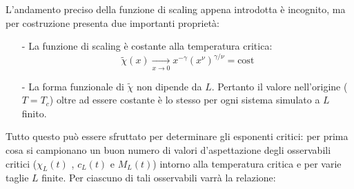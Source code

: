 \medskip
L'andamento preciso della funzione di scaling appena introdotta è incognito, ma per costruzione presenta due importanti proprietà:
\begin{itemize}
\item[-] La funzione di scaling è costante alla temperatura critica: 
		\begin{displaymath}
			\tilde{\chi}(x) \xrightarrow[x\rightarrow 0]{} x^{-\gamma}(x^\nu)^{\gamma/\nu} = \mbox{cost}
		\end{displaymath}
\item[-] La forma funzionale di $\tilde{\chi}$ non dipende da $L$. Pertanto il valore nell'origine ($T = T_c$) oltre ad essere costante è lo stesso per ogni sistema simulato a $L$ finito.
\end{itemize}

\medskip
Tutto questo può essere sfruttato per determinare gli esponenti critici: per prima cosa si campionano un buon numero di valori d'aspettazione degli osservabili critici ($\chi_L(t)$ , $c_L(t)$ e $M_L(t)$) intorno alla temperatura critica e per varie taglie $L$ finite. Per ciascuno di tali osservabili varrà la relazione:

